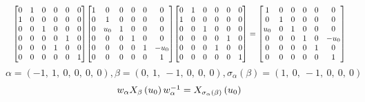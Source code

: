 \documentclass[11pt]{article}
\theoremstyle{definition}
\begin{document}
\[
\scaletoalign{\textwidth}{{\left[\begin{matrix}0 & 1 & 0 & 0 & 0 & 0\\1 & 0 & 0 & 0 & 0 & 0\\0 & 0 & 1 & 0 & 0 & 0\\0 & 0 & 0 & 0 & 1 & 0\\0 & 0 & 0 & 1 & 0 & 0\\0 & 0 & 0 & 0 & 0 & 1\end{matrix}\right]} {\left[\begin{matrix}1 & 0 & 0 & 0 & 0 & 0\\0 & 1 & 0 & 0 & 0 & 0\\0 & u_{0} & 1 & 0 & 0 & 0\\0 & 0 & 0 & 1 & 0 & 0\\0 & 0 & 0 & 0 & 1 & - u_{0}\\0 & 0 & 0 & 0 & 0 & 1\end{matrix}\right]} {\left[\begin{matrix}0 & 1 & 0 & 0 & 0 & 0\\1 & 0 & 0 & 0 & 0 & 0\\0 & 0 & 1 & 0 & 0 & 0\\0 & 0 & 0 & 0 & 1 & 0\\0 & 0 & 0 & 1 & 0 & 0\\0 & 0 & 0 & 0 & 0 & 1\end{matrix}\right]} = {\left[\begin{matrix}1 & 0 & 0 & 0 & 0 & 0\\0 & 1 & 0 & 0 & 0 & 0\\u_{0} & 0 & 1 & 0 & 0 & 0\\0 & 0 & 0 & 1 & 0 & - u_{0}\\0 & 0 & 0 & 0 & 1 & 0\\0 & 0 & 0 & 0 & 0 & 1\end{matrix}\right]}}
\]
\[
\alpha = \left( -1, \  1, \  0, \  0, \  0, \  0\right), \beta = \left( 0, \  1, \  -1, \  0, \  0, \  0\right), \sigma_{\alpha}(\beta) = \left( 1, \  0, \  -1, \  0, \  0, \  0\right)
\]
\[
\scaletoalign{\textwidth}{w_{\alpha} X_{\beta}\left(u_{0}\right) w_{\alpha}^{-1} = X_{\sigma_{\alpha}\left(\beta\right)}\left(u_{0}\right)}
\]
\end{document}
